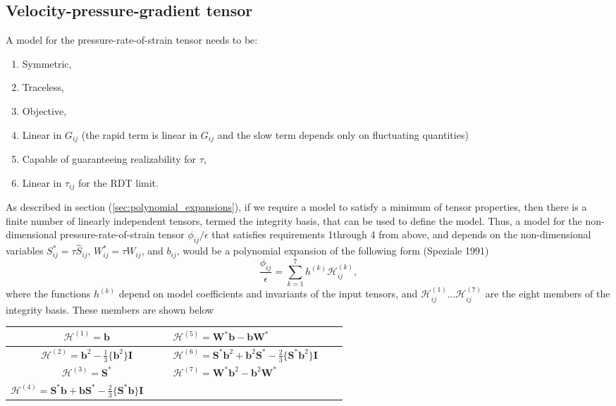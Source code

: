 \documentclass[oneside,a4paper,11pt]{report}
\newcommand{\rs}{\tau}          %
\newcommand{\redi}{\phi}        %
\newcommand{\Stau}{S^*}
\newcommand{\Wtau}{W^*}
\newcommand{\Sdev}{\hat{S}}
\begin{document}
\subsection{Velocity-pressure-gradient tensor}

A model for the pressure-rate-of-strain tensor needs to be:
\begin{enumerate}
\item Symmetric,
\item Traceless,
\item Objective,
\item Linear in $G_{ij}$ (the rapid term is linear in $G_{ij}$ and the slow term depends only on fluctuating quantities)
\item Capable of guaranteeing realizability for $\rs$,
\item Linear in $\rs_{ij}$ for the RDT limit.
\end{enumerate}
As described in section (\ref{sec:polynomial_expansions}), if we require a model to satisfy a minimum of tensor properties, then there is a finite number of linearly independent tensors, termed the integrity basis, that can be used to define the model. Thus, a model for the non-dimensional pressure-rate-of-strain tensor $\redi_{ij}/\epsilon$ that satisfies requirements 1through 4 from above, and depends on the non-dimensional variables $\Stau_{ij} = \tau \Sdev_{ij}$, $\Wtau_{ij} = \tau W_{ij}$, and $b_{ij}$, would be a polynomial expansion of the following form (Speziale 1991)
\begin{equation}
\frac{\redi_{ij}}{\epsilon} = \sum_{k=1}^7 h^{(k)} \mathcal{H}^{(k)}_{ij},
\end{equation}
where the functions $h^{(k)}$ depend on model coefficients and invariants of the input tensors, and $\mathcal{H}^{(1)}_{ij} ... \mathcal{H}^{(7)}_{ij}$ are the eight members of the integrity basis. These members are shown below
\begin{center}
\begin{tabular} {| Sl | Sl | }
\hline
$\boldsymbol{\mathcal{H}}^{(1)} = \mathbf{b}$ & $\boldsymbol{\mathcal{H}}^{(5)} = \mathbf{\Wtau} \mathbf{b} - \mathbf{b} \mathbf{\Wtau}$ \\
\hline
$\boldsymbol{\mathcal{H}}^{(2)} = \mathbf{b}^2 - \frac{1}{3} \{ \mathbf{b}^2 \} \mathbf{I}$ & $\boldsymbol{\mathcal{H}}^{(6)} = \mathbf{\Stau} \mathbf{b}^2 + \mathbf{b}^2 \mathbf{\Stau} - \frac{2}{3} \{ \mathbf{\Stau} \mathbf{b}^2 \} \mathbf{I}$ \\
\hline
$\boldsymbol{\mathcal{H}}^{(3)} = \mathbf{\Stau} $ & $ \boldsymbol{\mathcal{H}}^{(7)} = \mathbf{\Wtau} \mathbf{b}^2 - \mathbf{b}^2 \mathbf{\Wtau} $ \\
\hline
$ \boldsymbol{\mathcal{H}}^{(4)} = \mathbf{\Stau} \mathbf{b} + \mathbf{b} \mathbf{\Stau} - \frac{2}{3} \{ \mathbf{\Stau} \mathbf{b} \} \mathbf{I}  \qquad$ & \\
\hline
\end{tabular}
\end{center}
\end{document}
